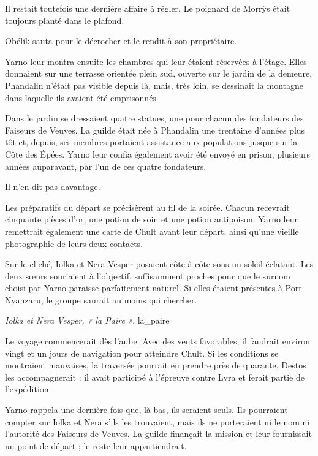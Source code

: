 Il restait toutefois une dernière affaire à régler. Le poignard de Morrÿs était toujours planté dans le plafond.

Obélik sauta pour le décrocher et le rendit à son propriétaire.

\scenebreak

Yarno leur montra ensuite les chambres qui leur étaient réservées à l'étage. Elles donnaient sur une terrasse orientée plein sud, ouverte sur le jardin de la demeure. Phandalin n'était pas visible depuis là, mais, très loin, se dessinait la montagne dans laquelle ils avaient été emprisonnés.

Dans le jardin se dressaient quatre statues, une pour chacun des fondateurs des Faiseurs de Veuves. La guilde était née à Phandalin une trentaine d'années plus tôt et, depuis, ses membres portaient assistance aux populations jusque sur la Côte des Épées. Yarno leur confia également avoir été envoyé en prison, plusieurs années auparavant, par l'un de ces quatre fondateurs.

Il n'en dit pas davantage.

Les préparatifs du départ se précisèrent au fil de la soirée. Chacun recevrait cinquante pièces d'or, une potion de soin et une potion antipoison. Yarno leur remettrait également une carte de Chult avant leur départ, ainsi qu'une vieille photographie de leurs deux contacts.

Sur le cliché, Iolka et Nera Vesper posaient côte à côte sous un soleil éclatant. Les deux sœurs souriaient à l'objectif, suffisamment proches pour que le surnom choisi par Yarno paraisse parfaitement naturel. Si elles étaient présentes à Port Nyanzaru, le groupe saurait au moins qui chercher.

{\textit{Iolka et Nera Vesper, « la Paire ».}}
{la_paire}

Le voyage commencerait dès l'aube. Avec des vents favorables, il faudrait environ vingt et un jours de navigation pour atteindre Chult. Si les conditions se montraient mauvaises, la traversée pourrait en prendre près de quarante. Destos les accompagnerait : il avait participé à l'épreuve contre Lyra et ferait partie de l'expédition.

Yarno rappela une dernière fois que, là-bas, ils seraient seuls. Ils pourraient compter sur Iolka et Nera s'ils les trouvaient, mais ils ne porteraient ni le nom ni l'autorité des Faiseurs de Veuves. La guilde finançait la mission et leur fournissait un point de départ ; le reste leur appartiendrait.

